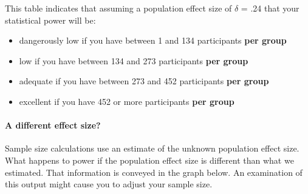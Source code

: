 \documentclass[
]{krantz}
\begin{document}
This table indicates that assuming a population effect size of \(\delta\) = .24 that your statistical power will be:

\begin{itemize}
\item
  dangerously low if you have between 1 and 134 participants \textbf{per group}
\item
  low if you have between 134 and 273 participants \textbf{per group}
\item
  adequate if you have between 273 and 452 participants \textbf{per group}
\item
  excellent if you have 452 or more participants \textbf{per group}
\end{itemize}

\hypertarget{a-different-effect-size}{%
\paragraph{A different effect size?}\label{a-different-effect-size}}

Sample size calculations use an estimate of the unknown population effect size. What happens to power if the population effect size is different than what we estimated. That information is conveyed in the graph below. An examination of this output might cause you to adjust your sample size.
\end{document}
